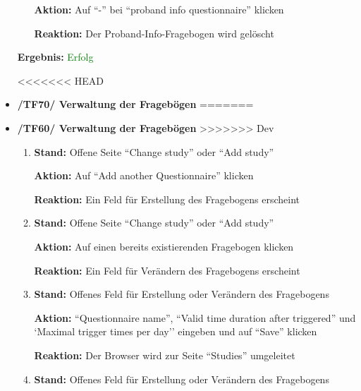\documentclass[a4paper]{scrreprt}
\begin{document}
\begin{itemize}
\begin{enumerate}
		                                    \par \textbf{Aktion: }Auf ``-'' bei ``proband info questionnaire'' klicken
		                                    \par \textbf{Reaktion: }Der Proband-Info-Fragebogen wird gel\"oscht
		                          \end{enumerate}
		      					\vspace*{0.3cm}
		      		           \par \textbf{Ergebnis: }\textcolor{green}{Erfolg}
		      		           \vspace*{0.6cm}  	
		      		
<<<<<<< HEAD
		                      \item \textbf{/TF70/ Verwaltung der Frageb\"ogen}
=======
		                      \item \textbf{/TF60/ Verwaltung der Frageb\"ogen}
>>>>>>> Dev
		                          \begin{enumerate}
		                              \item \par \textbf{Stand: }Offene Seite ``Change study'' oder ``Add study''
		                                    \par \textbf{Aktion: }Auf ``Add another Questionnaire'' klicken
		                                    \par \textbf{Reaktion: }Ein Feld f\"ur Erstellung des Fragebogens erscheint
		      						\item \par \textbf{Stand: }Offene Seite ``Change study'' oder ``Add study''
		                                    \par \textbf{Aktion: }Auf einen bereits existierenden Fragebogen klicken
		                                    \par \textbf{Reaktion: }Ein Feld f\"ur Ver\"andern des Fragebogens erscheint
		                              \item \par \textbf{Stand: }Offenes Feld f\"ur Erstellung oder Ver\"andern des Fragebogens
		                                    \par \textbf{Aktion: }``Questionnaire name'', ``Valid time duration after triggered'' und `Maximal trigger times per day'' eingeben und auf ``Save'' klicken
		                                    \par \textbf{Reaktion: }Der Browser wird zur Seite ``Studies'' umgeleitet
		                              \item \par \textbf{Stand: }Offenes Feld f\"ur Erstellung oder Ver\"andern des Fragebogens

\end{enumerate}
\end{itemize}
\end{document}
